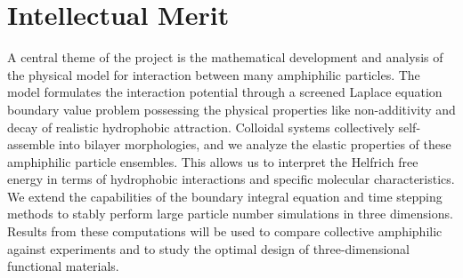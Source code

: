 \section{Intellectual Merit}
A central theme of the project is the mathematical development and
analysis of the physical model for interaction between many amphiphilic
particles. The model formulates the interaction potential through a
screened Laplace equation boundary value problem possessing the physical
properties like non-additivity and decay of realistic hydrophobic
attraction. Colloidal systems collectively self-assemble into bilayer
morphologies, and we analyze the elastic properties of these amphiphilic
particle ensembles. This allows us to interpret the Helfrich free energy
in terms of hydrophobic interactions and specific molecular
characteristics. We extend the capabilities of the boundary integral
equation and time stepping methods to stably perform large particle
number simulations in three dimensions. Results from these computations
will be used to compare collective amphiphilic against experiments and
to study the optimal design of three-dimensional functional materials. 

